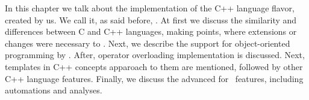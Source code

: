 
In this chapter we talk about the implementation of the C++ language flavor, created by us. We call it,
as said before, \pcpp. At first we discuss the similarity and differences between C and C++ languages, 
making points, where extensions or changes were necessary to \mbdr. Next, we describe the support for 
object-oriented programming by \pcpp. After, operator overloading implementation is discussed. Next, 
templates in C++ concepts apparoach to them are mentioned, followed by other C++ language features. 
Finally, we discuss the advanced  for \pcpp\ features, including automations and analyses.


%



%



%



%


%



%
